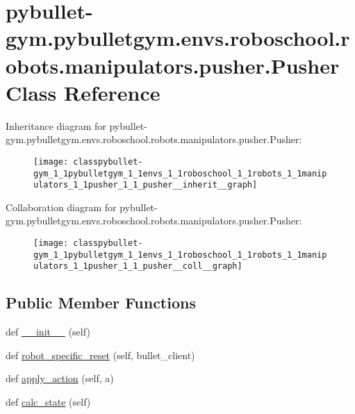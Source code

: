 \hypertarget{classpybullet-gym_1_1pybulletgym_1_1envs_1_1roboschool_1_1robots_1_1manipulators_1_1pusher_1_1_pusher}{}\section{pybullet-\/gym.pybulletgym.\+envs.\+roboschool.\+robots.\+manipulators.\+pusher.\+Pusher Class Reference}
\label{classpybullet-gym_1_1pybulletgym_1_1envs_1_1roboschool_1_1robots_1_1manipulators_1_1pusher_1_1_pusher}


Inheritance diagram for pybullet-\/gym.pybulletgym.\+envs.\+roboschool.\+robots.\+manipulators.\+pusher.\+Pusher\+:
\nopagebreak
\begin{figure}[H]
\begin{center}
\leavevmode
\texttt{[image: classpybullet-gym\_1\_1pybulletgym\_1\_1envs\_1\_1roboschool\_1\_1robots\_1\_1manipulators\_1\_1pusher\_1\_1\_pusher\_\_inherit\_\_graph]}
\end{center}
\end{figure}


Collaboration diagram for pybullet-\/gym.pybulletgym.\+envs.\+roboschool.\+robots.\+manipulators.\+pusher.\+Pusher\+:
\nopagebreak
\begin{figure}[H]
\begin{center}
\leavevmode
\texttt{[image: classpybullet-gym\_1\_1pybulletgym\_1\_1envs\_1\_1roboschool\_1\_1robots\_1\_1manipulators\_1\_1pusher\_1\_1\_pusher\_\_coll\_\_graph]}
\end{center}
\end{figure}
\subsection*{Public Member Functions}
\begin{DoxyCompactItemize}
\item 
def \hyperlink{classpybullet-gym_1_1pybulletgym_1_1envs_1_1roboschool_1_1robots_1_1manipulators_1_1pusher_1_1_pusher_a4a85c6b52bc12f240bd8bdb45f350b6b}{\+\_\+\+\_\+init\+\_\+\+\_\+} (self)
\item 
def \hyperlink{classpybullet-gym_1_1pybulletgym_1_1envs_1_1roboschool_1_1robots_1_1manipulators_1_1pusher_1_1_pusher_ab4895c829fbc4ca2631bad77532ad092}{robot\+\_\+specific\+\_\+reset} (self, bullet\+\_\+client)
\item 
def \hyperlink{classpybullet-gym_1_1pybulletgym_1_1envs_1_1roboschool_1_1robots_1_1manipulators_1_1pusher_1_1_pusher_a8fa2872a5ef213745b10d3607e8e848f}{apply\+\_\+action} (self, a)
\item 
def \hyperlink{classpybullet-gym_1_1pybulletgym_1_1envs_1_1roboschool_1_1robots_1_1manipulators_1_1pusher_1_1_pusher_a24b78e34b7392e6824318cf1a7133c2f}{calc\+\_\+state} (self)
\end{DoxyCompactItemize}
